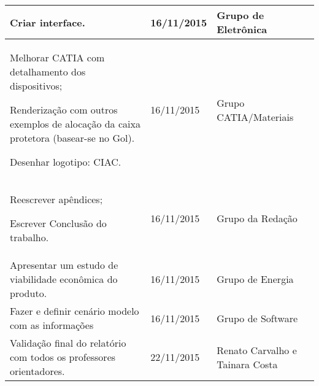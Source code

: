 \begin{table}[]
\begin{tabular}{|p{5cm}|p{3cm}|p{5cm}|}
Criar interface. & 16/11/2015 & Grupo de Eletrônica \\
  \hline
  Melhorar CATIA com detalhamento dos dispositivos;

Renderização com outros exemplos de alocação da caixa protetora (basear-se no Gol).

Desenhar logotipo: CIAC. & 16/11/2015 & Grupo CATIA/Materiais \\
  \hline
  Reescrever apêndices;

Escrever Conclusão do trabalho.
 & 16/11/2015 & Grupo da Redação \\
  \hline
  Apresentar um estudo de viabilidade econômica do produto. & 16/11/2015 & Grupo de Energia \\
  \hline
  Fazer e definir cenário modelo com as informações & 16/11/2015  & Grupo de Software \\
  \hline
  Validação final do relatório com todos os professores orientadores. & 22/11/2015 & Renato Carvalho e Tainara Costa \\
  \hline
\end{tabular}
\end{table}

